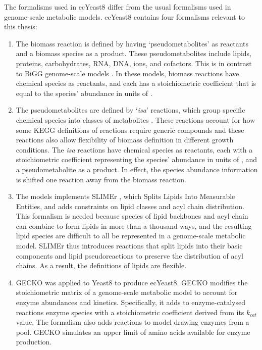 The formalisms used in ecYeast8 differ from the usual formalisms used in genome-scale metabolic models.
ecYeast8 contains four formalisms relevant to this thesis:
\begin{enumerate}
  \item
        The biomass reaction is defined by having `pseudometabolites' as reactants and a biomass species as a product.
        These pseudometabolites include lipids, proteins, carbohydrates, RNA, DNA, ions, and cofactors.
        This is in contrast to BiGG genome-scale models \parencite{norsigianBiGGModels20202020}.
        In these models, biomass reactions have chemical species as reactants, and each has a stoichiometric coefficient that is equal to the species' abundance in units of \SI{}{\mmolgdw}.
  \item
        The pseudometabolites are defined by `\textit{isa}' reactions, which group specific chemical species into classes of metabolites \parencite{heavnerYeastExpandedReconstruction2012}.
        These reactions account for how some KEGG definitions of reactions require generic compounds and these reactions also allow flexibility of biomass definition in different growth conditions.
        The \textit{isa} reactions have chemical species as reactants, each with a stoichiometric coefficient representing the species' abundance in units of \SI{}{\mmolgdw}, and a pseudometabolite as a product.
        In effect, the species abundance information is shifted one reaction away from the biomass reaction.
  \item
        The models implements SLIMEr \parencite{sanchezSLIMErProbingFlexibility2019}, which Splits Lipids Into Measurable Entities, and adds constraints on lipid classes and acyl chain distribution.
        This formalism is needed because species of lipid backbones and acyl chain can combine to form lipids in more than a thousand ways, and the resulting lipid species are difficult to all be represented in a genome-scale metabolic model.
        SLIMEr thus introduces reactions that split lipids into their basic components and lipid pseudoreactions to preserve the distribution of acyl chains.
        As a result, the definitions of lipids are flexible.
  \item
        GECKO \parencite{sanchezImprovingPhenotypePredictions2017} was applied to Yeast8 to produce ecYeast8.
        GECKO modifies the stoichiometric matrix of a genome-scale metabolic model to account for enzyme abundances and kinetics.
        Specifically, it adds to enzyme-catalysed reactions enzyme species with a stoichiometric coefficient derived from its $k_{cat}$ value.
        The formalism also adds reactions to model drawing enzymes from a pool.
        GECKO simulates an upper limit of amino acids available for enzyme production.
\end{enumerate}


